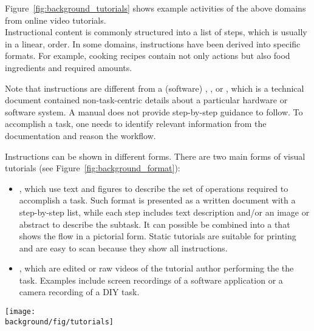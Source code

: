 Figure~\ref{fig:background_tutorials} shows example activities of the above domains from online video tutorials.
\\

%
Instructional content is commonly structured into a list of steps, which is usually in a linear,  order.
%
In some domains, instructions have been derived into specific formats. For example, cooking recipes contain not only actions but also food ingredients and required amounts.

Note that instructions are different from a (software) , , or , which is a technical document contained non-task-centric details about a particular hardware or software system. A manual does not provide step-by-step guidance to follow. To accomplish a task, one needs to identify relevant information from the documentation and reason the workflow.

Instructions can be shown in different forms. There are two main forms of visual tutorials (see Figure~\ref{fig:background_format}):
\begin{itemize}
  \itemsep -2pt
  \item {}, which use text and figures to describe the set of operations required to accomplish a task. Such format is presented as a written document with a step-by-step list, while each step includes text description and/or an image or abstract  to describe the subtask. It can possible be combined into a  that shows the flow in a pictorial form. Static tutorials are suitable for printing and are easy to scan because they show all instructions.
  \item {}, which are edited or raw videos of the tutorial author performing the the task. Examples include screen recordings of a software application or a camera recording of a DIY task.
\end{itemize}

\begin{figure*}[t]
  \centering
  \texttt{[image: \\background/fig/tutorials]}
  \caption{Example activities in tutorial domains: a) image manipulations using a software application, b) a DIY gift-wrapping project, c) cooking as an everyday activity, and d) dancing in sports. }
  \label{fig:background_tutorials}
\end{figure*}

